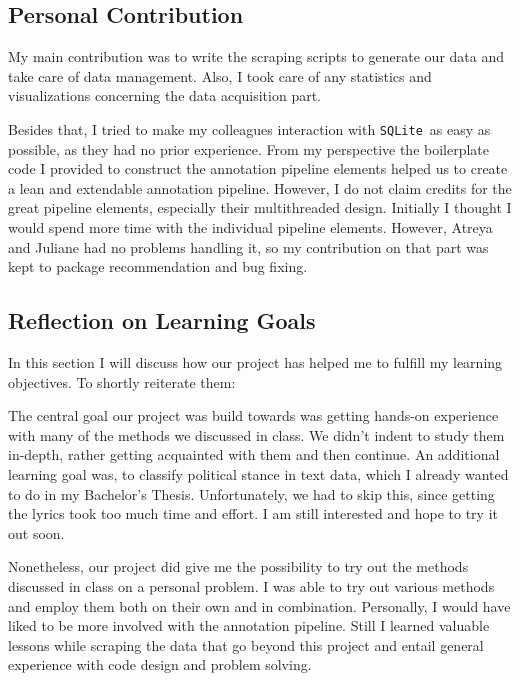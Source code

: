 \documentclass[11pt,a4paper]{article}
\begin{document}
\subsection{Personal Contribution}\label{sec:contribution}

My main contribution was to write the scraping scripts to generate our data and take care of data management. Also, I took care of any statistics and visualizations concerning the data acquisition part. 

Besides that, I tried to make my colleagues interaction with \texttt{SQLite} as easy as possible, as they had no prior experience. From my perspective the boilerplate code I provided to construct the annotation pipeline elements helped us to create a lean and extendable annotation pipeline. However, I do not claim credits for the great pipeline elements, especially their multithreaded design.
Initially I thought I would spend more time with the individual pipeline elements. However, Atreya and Juliane had no problems handling it, so my contribution on that part was kept to package recommendation and bug fixing. 

\subsection{Reflection on Learning Goals}\label{sec:goals}
In this section I will discuss how our project has helped me to fulfill my learning objectives. To shortly reiterate them: 

The central goal our project was build towards was getting hands-on experience with many of the methods we discussed in class. We didn't indent to study them in-depth, rather getting acquainted with them and then continue.
An additional learning goal was, to classify political stance in text data, which I already wanted to do in my Bachelor's Thesis. Unfortunately, we had to skip this, since getting the lyrics took too much time and effort. I am still interested and hope to try it out soon.

Nonetheless, our project did give me the possibility to try out the methods discussed in class on a personal problem. I was able to try out various methods and employ them both on their own and in combination. Personally, I would have liked to be more involved with the annotation pipeline. Still I learned valuable lessons while scraping the data that go beyond this project and entail general experience with code design and problem solving.
\end{document}
